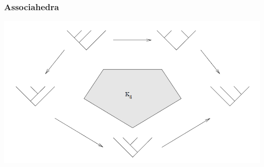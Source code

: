 \documentclass{beamer}
\theoremstyle{definition}
\begin{document}
\begin{frame}
\frametitle{Associahedra}
\includegraphics[scale=0.5]{Imagenes/assoc}
\end{frame}
\end{document}
